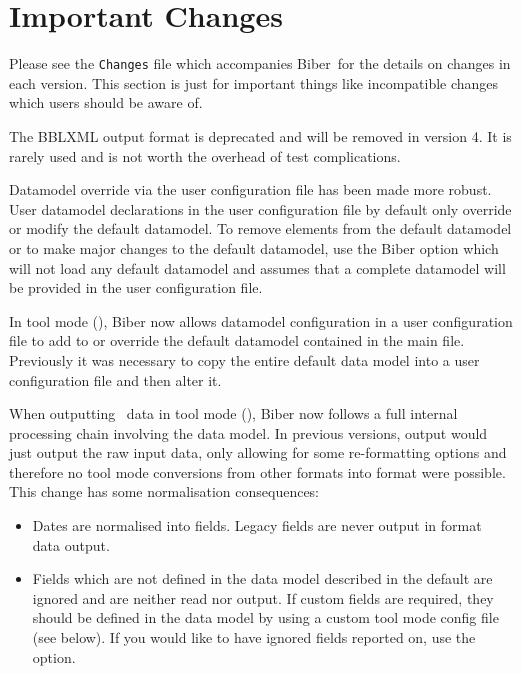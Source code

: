 \documentclass{ltxdockit}
\newcommand*{\biber}{Biber\xspace}
\begin{document}
\printtitlepage
\tableofcontents

\section{Important Changes}\label{special}

Please see the \verb+Changes+ file which accompanies \biber\ for the
details on changes in each version. This section is just for important
things like incompatible changes which users should be aware of.

The BBLXML output format is deprecated and will be removed in version 4. It
is rarely used and is not worth the overhead of test complications.

Datamodel override via the user configuration file has been made more
robust. User datamodel declarations in the user configuration file by
default only override or modify the default datamodel. To remove elements
from the default datamodel or to make major changes to the default
datamodel, use the \biber option  which will
not load any default datamodel and assumes that a complete datamodel will
be provided in the user configuration file.

In tool mode (), \biber now allows datamodel configuration in
a user configuration file to add to or override the default datamodel
contained in the main  file. Previously it was
necessary to copy the entire default data model into a user configuration
file and then alter it.

When outputting \bibtex\ data in tool mode (), \biber now
follows a full internal processing chain involving the data model. In
previous versions, \bibtex output would just output the raw
\bibtex input data, only allowing for some re-formatting options and
therefore no tool mode conversions from other formats into \bibtex format
were possible. This change has some normalisation consequences:

\begin{itemize}
\item Dates are normalised into  fields. Legacy
   fields are never output in \bibtex format data output.
\item Fields which are not defined in the data model described in the
  default  are ignored and are neither read nor
  output. If custom fields are required, they should be defined in the data
  model by using a custom tool mode config file (see below). If you would
  like to have ignored fields reported on, use the
   option.
\end{itemize}
\end{document}
